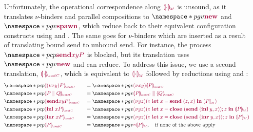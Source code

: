\documentclass[main.tex]{subfiles}
\begin{document}
Unfortunately, the operational correspondence along $\tm{\cpgvM{\cdot}}$ is unsound, as it translates $\nu$-binders and parallel compositions to $\pgv{\tm{\new}}$ and $\pgv{\tm{\spawn}}$, which reduce back to their equivalent configuration constructs using  and . The same goes for $\nu$-binders which are inserted as a result of translating bound send to unbound send. For instance, the process $\pcp{\tm{\send{x}{y}{P}}}$ is blocked, but its translation uses $\pgv{\tm{\new}}$ and can reduce. To address this issue, we use a second translation, $\tm{\cpgvC{\cdot}}$, which is equivalent to $\tm{\cpgvM{\cdot}}$ followed by reductions using  and :
\begin{align*}
  &\pcp{\tm{\cpgvC{\res{x}{y}{P}}}}
  &&= \pgv{\tm{\res{x}{y}{\cpgvC{P}}}}
  \\
  &\pcp{\tm{\cpgvC{\ppar{P}{Q}}}}
  &&= \pgv{\tm{\ppar{\cpgvC{P}}{\cpgvC{Q}}}}
  \\
  &\pcp{\tm{\cpgvC{\send{x}{y}{P}}}}
  &&= \pgv{\tm{\res{y}{z}{(\child\;\letbind{x}{\send\;\pair{z}{x}}{\cpgvM{P}})}}}
  \\
  &\pcp{\tm{\cpgvC{\inl{x}{P}}}}
  &&= \pgv{\tm{\res{y}{z}{(\child\;\letbind{x}{\andthen{\close\;(\send\;\pair{\inl{y}}{x})}{z}}{\cpgvM{P}})}}}
  \\
  &\pcp{\tm{\cpgvC{\inr{x}{P}}}}
  &&= \pgv{\tm{\res{y}{z}{(\child\;\letbind{x}{\andthen{\close\;(\send\;\pair{\inr{y}}{x})}{z}}{\cpgvM{P}})}}}
  \\
  &\pcp{\tm{\cpgvC{P}}}
  &&= \pgv{\tm{\child{\cpgvM{P}}}},\quad\text{if none of the above apply}
\end{align*}
\end{document}
